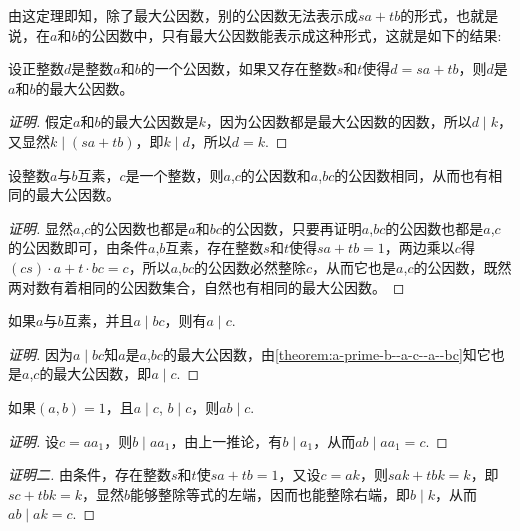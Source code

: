 由这定理即知，除了最大公因数，别的公因数无法表示成$sa+tb$的形式，也就是说，在$a$和$b$的公因数中，只有最大公因数能表示成这种形式，这就是如下的结果:
\begin{theorem}
  设正整数$d$是整数$a$和$b$的一个公因数，如果又存在整数$s$和$t$使得$d=sa+tb$，则$d$是$a$和$b$的最大公因数。
\end{theorem}

\begin{proof}[证明]
  假定$a$和$b$的最大公因数是$k$，因为公因数都是最大公因数的因数，所以$d \mid k$，又显然$k \mid (sa+tb)$，即$k \mid d$，所以$d=k$.
\end{proof}

\begin{theorem}
  \label{theorem:a-prime-b--a-c--a--bc}
  设整数$a$与$b$互素，$c$是一个整数，则$a$,$c$的公因数和$a$,$bc$的公因数相同，从而也有相同的最大公因数。
\end{theorem}

\begin{proof}[证明]
  显然$a$,$c$的公因数也都是$a$和$bc$的公因数，只要再证明$a$,$bc$的公因数也都是$a$,$c$的公因数即可，由条件$a$,$b$互素，存在整数$s$和$t$使得$sa+tb=1$，两边乘以$c$得$(cs)\cdot a+t\cdot bc=c$，所以$a$,$bc$的公因数必然整除$c$，从而它也是$a$,$c$的公因数，既然两对数有着相同的公因数集合，自然也有相同的最大公因数。
\end{proof}

\begin{inference}
  如果$a$与$b$互素，并且$a \mid bc$，则有$a \mid c$.
\end{inference}

\begin{proof}[证明]
  因为$a \mid bc$知$a$是$a$,$bc$的最大公因数，由\autoref{theorem:a-prime-b--a-c--a--bc}知它也是$a$,$c$的最大公因数，即$a \mid c$.
\end{proof}

\begin{inference}
  如果$(a,b)=1$，且$a \mid c$, $b \mid c$，则$ab \mid c$.
\end{inference}

\begin{proof}[证明]
  设$c=aa_1$，则$b \mid aa_1$，由上一推论，有$b \mid a_1$，从而$ab \mid aa_1=c$.
\end{proof}

\begin{proof}[证明二]
  由条件，存在整数$s$和$t$使$sa+tb=1$，又设$c=ak$，则$sak+tbk=k$，即$sc+tbk=k$，显然$b$能够整除等式的左端，因而也能整除右端，即$b \mid k$，从而$ab \mid ak=c$.
\end{proof}

